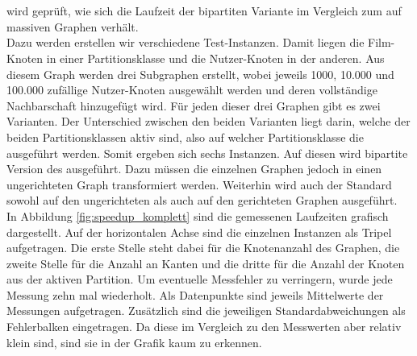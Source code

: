 

\section{}
\label{kap:result}
 wird geprüft, wie sich die Laufzeit der bipartiten \gc{}
Variante im Vergleich zum \gc{} auf massiven Graphen verhält.
\\

Dazu werden erstellen wir verschiedene Test-Instanzen.
 Damit liegen die Film-Knoten in einer Partitionsklasse und 
die Nutzer-Knoten in der anderen.
Aus diesem Graph werden drei Subgraphen erstellt, wobei jeweils 1000, 10.000 und 100.000  zufällige
Nutzer-Knoten ausgewählt werden und deren vollständige Nachbarschaft hinzugefügt wird.
Für jeden dieser drei Graphen gibt es zwei Varianten. Der Unterschied
zwischen den beiden Varianten liegt darin, welche der beiden Partitionsklassen aktiv sind, 
also auf welcher Partitionsklasse die  ausgeführt werden.
Somit ergeben sich sechs Instanzen. Auf diesen wird 
 bipartite Version des \gc{} ausgeführt. Dazu müssen die
einzelnen Graphen jedoch in einen ungerichteten Graph transformiert werden.
Weiterhin wird auch der Standard  
sowohl auf den ungerichteten als auch auf den gerichteten Graphen ausgeführt.
\\

In Abbildung \ref{fig:speedup_komplett} sind die gemessenen Laufzeiten grafisch dargestellt.
Auf der horizontalen Achse sind die einzelnen Instanzen als Tripel aufgetragen.
Die erste Stelle steht dabei für die Knotenanzahl des Graphen, 
die zweite Stelle für die Anzahl an Kanten und die dritte für die Anzahl der Knoten aus 
der aktiven Partition. Um eventuelle Messfehler zu verringern, wurde jede Messung zehn mal 
wiederholt. Als Datenpunkte sind jeweils Mittelwerte der Messungen aufgetragen.
Zusätzlich sind die jeweiligen Standardabweichungen als Fehlerbalken eingetragen. Da
diese im Vergleich zu den Messwerten aber relativ klein sind, sind sie in der Grafik kaum zu erkennen.
\\

